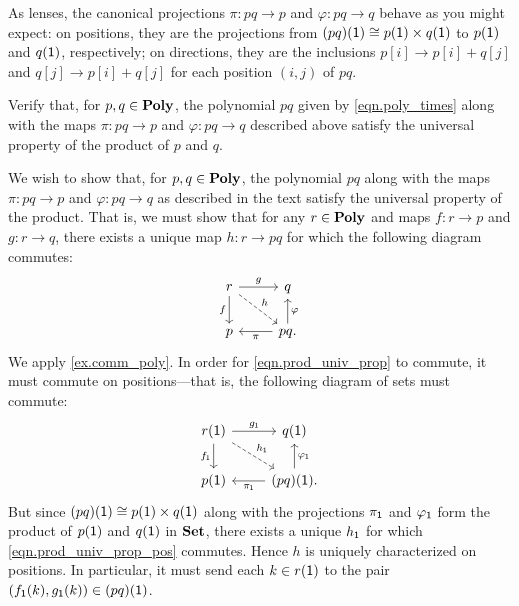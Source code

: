 \documentclass[Book-Poly]{subfiles}
\begin{document}
As lenses, the canonical projections $\pi \colon pq \to p$ and $\varphi \colon pq \to q$ behave as you might expect: on positions, they are the projections from $(pq)(\textsf{1}) \cong p(\textsf{1}) \times q(\textsf{1})$ to $p(\textsf{1})$ and $q(\textsf{1})$, respectively; on directions, they are the inclusions $p[i] \to p[i] + q[j]$ and $q[j] \to p[i] + q[j]$ for each position $(i, j)$ of $pq$.

\begin{exercise} \label{exc.poly_prod}
Verify that, for $p, q \in \mathbf{Poly}$, the polynomial $pq$ given by \eqref{eqn.poly_times} along with the maps $\pi \colon pq \to p$ and $\varphi \colon pq \to q$ described above satisfy the universal property of the product of $p$ and $q$.
\begin{solution}
We wish to show that, for $p, q \in \mathbf{Poly}$, the polynomial $pq$ along with the maps $\pi \colon pq \to p$ and $\varphi \colon pq \to q$ as described in the text satisfy the universal property of the product.
That is, we must show that for any $r \in \mathbf{Poly}$ and maps $f \colon r \to p$ and $g \colon r \to q$, there exists a unique map $h \colon r \to pq$ for which the following diagram commutes:
\begin{equation} \label{eqn.prod_univ_prop}
\begin{tikzcd}
	r \ar[d, "f"'] \ar[r, "g"] \ar[dr, "h", dashed] & q \\
	p & pq. \ar[l, "\pi"] \ar[u, "\varphi"'] 
\end{tikzcd}
\end{equation}
We apply \cref{ex.comm_poly}.
In order for \eqref{eqn.prod_univ_prop} to commute, it must commute on positions---that is, the following diagram of sets must commute:
\begin{equation} \label{eqn.prod_univ_prop_pos}
\begin{tikzcd}
	r(\1) \ar[d, "f_\1"'] \ar[r, "g_\1"] \ar[dr, "h_\1", dashed] & q(\1) \\
	p(\1) & (pq)(\1). \ar[l, "\pi_\1"] \ar[u, "\varphi_\1"'] 
\end{tikzcd}
\end{equation}
But since $(pq)(\textsf{1}) \cong p(1) \times q(\textsf{1})$ along with the projections $\pi_{\textsf{1}}$ and $\varphi_{\textsf{1}}$ form the product of $p(\textsf{1})$ and $q(\textsf{1})$ in $\mathbf{Set}$, there exists a unique $h_{\textsf{1}}$ for which \eqref{eqn.prod_univ_prop_pos} commutes.
Hence $h$ is uniquely characterized on positions.
In particular, it must send each $k \in r(\textsf{1})$ to the pair $(f_{\textsf{1}}(k), g_{\textsf{1}}(k)) \in (pq)(\textsf{1})$.


\end{solution}
\end{exercise}
\end{document}
